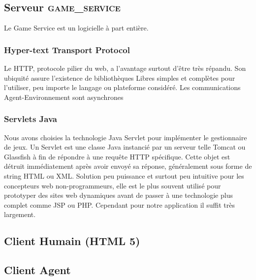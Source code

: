   
  
  
\subsection{Serveur \textsc{game\_service}}

Le Game Service est un logicielle à part entière.

\subsubsection{\og Hyper-text Transport Protocol \fg{}}

Le HTTP, protocole pilier du web, a l'avantage surtout d'être très répandu. Son ubiquité assure l'existence de bibliothèques Libres simples et complètes pour l'utiliser, peu importe le langage ou plateforme considéré. 
Les communications Agent-Environnement sont asynchrones 

\subsubsection{Servlets Java}

Nous avons choisies la technologie Java Servlet pour implémenter le gestionnaire de jeux. Un Servlet est une classe Java instancié par un serveur telle Tomcat ou Glassfish à fin de répondre à une requête HTTP spécifique. Cette objet est détruit immédiatement après avoir envoyé sa réponse, généralement sous forme de string HTML ou XML.
Solution peu puissance et surtout peu intuitive pour les concepteurs web non-programmeurs, elle est le plus souvent utilisé pour prototyper des sites web dynamiques avant de passer à une technologie plus complet comme JSP ou PHP. Cependant pour notre application il suffit très largement.

\subsection{Client Humain (HTML 5)}
    
\subsection{Client Agent}
    